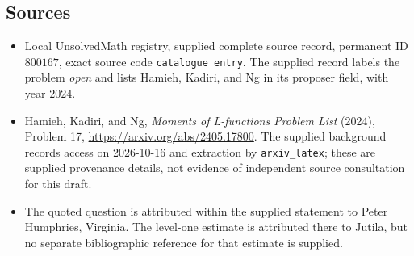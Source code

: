 \documentclass[11pt]{article}
\begin{document}
\subsection{Sources}
\begin{itemize}
\item Local UnsolvedMath registry, supplied complete source record, permanent ID \(800167\), exact source code \texttt{catalogue entry}. The supplied record labels the problem \emph{open} and lists Hamieh, Kadiri, and Ng in its proposer field, with year \(2024\).
\item Hamieh, Kadiri, and Ng, \emph{Moments of L-functions Problem List} (2024), Problem 17, \url{https://arxiv.org/abs/2405.17800}. The supplied background records access on 2026-10-16 and extraction by \texttt{arxiv\_latex}; these are supplied provenance details, not evidence of independent source consultation for this draft.
\item The quoted question is attributed within the supplied statement to Peter Humphries, Virginia. The level-one estimate is attributed there to Jutila, but no separate bibliographic reference for that estimate is supplied.
\end{itemize}
\end{document}
